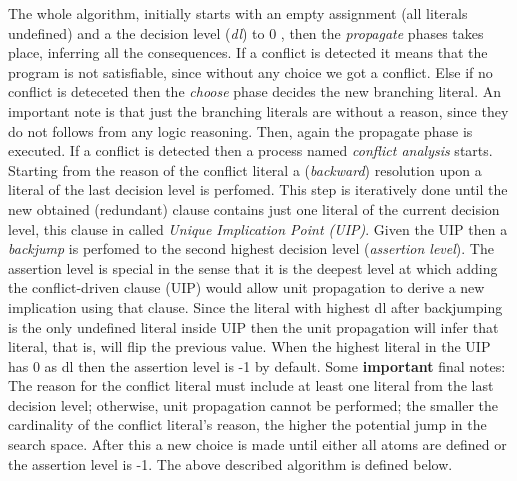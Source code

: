 The whole algorithm, initially starts with an empty assignment (all literals undefined)
and a the decision level (\textit{dl}) to 0  ,
then the \textit{propagate} phases takes place, inferring all the consequences.
If a conflict is detected it means that the program is not satisfiable, since 
without any choice we got a conflict.
Else if no conflict is deteceted then the \textit{choose} phase decides the new branching literal.
An important note is that just the branching literals are without a reason, since they 
do not follows from any logic reasoning.
Then, again the propagate phase is executed.
If a conflict is detected then a process named \textit{conflict analysis} starts.
Starting from the reason of the conflict literal a (\textit{backward}) resolution upon a literal of the last
decision level is perfomed. This step is iteratively done until the new obtained (redundant) clause 
contains just one literal of the current decision level, this clause in called
\textit{Unique Implication Point (UIP)}.
Given the UIP then a \textit{backjump} is perfomed to the second highest decision level
(\textit{assertion level}). The assertion level is special in the sense that it is the deepest level
at which adding the conﬂict-driven clause (UIP) would allow unit propagation to derive
a new implication using that clause. Since the literal with highest dl after backjumping 
is the only undefined literal inside UIP then the unit propagation will infer that literal,
that is, will flip the previous value.
When the highest literal in the UIP has 0 as dl then the assertion level is -1 by default.
Some \textbf{important} final notes: The reason for the conflict literal must include 
at least one literal from the last decision level; otherwise, unit propagation 
cannot be performed; the smaller the cardinality of the conflict literal's reason, 
the higher the potential jump in the search space.
After this a new choice is made until either all atoms are defined or the
assertion level is -1.
The above described algorithm is defined below.
